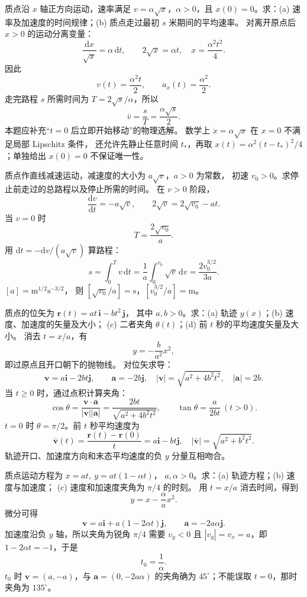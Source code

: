 质点沿 $x$ 轴正方向运动，速率满足 $v=\alpha\sqrt{x}$，$\alpha>0$，且
$x(0)=0$。求：(a) 速率及加速度的时间规律；(b) 质点走过最初 $s$ 米期间的平均速率。
\exsolution
对离开原点后 $x>0$ 的运动分离变量：
\[
 \frac{\mathrm dx}{\sqrt{x}}=\alpha\,\mathrm dt,\qquad
 2\sqrt{x}=\alpha t,
\quad x=\frac{\alpha^2t^2}{4}.
\]
因此
\[
 \boxed{v(t)=\frac{\alpha^2t}{2},\qquad a_x(t)=\frac{\alpha^2}{2}.}
\]
走完路程 $s$ 所需时间为 $T=2\sqrt{s}/\alpha$，所以
\[
 \boxed{\bar v=\frac{s}{T}=\frac{\alpha\sqrt{s}}2.}
\]
\excheck 本题应补充“$t=0$ 后立即开始移动”的物理选解。
数学上 $\dot x=\alpha\sqrt{x}$ 在 $x=0$ 不满足局部 Lipschitz 条件，
还允许先静止任意时间 $t_*$，再取
$x(t)=\alpha^2(t-t_*)^2/4$；单独给出 $x(0)=0$ 不保证唯一性。

质点作直线减速运动，减速度的大小为 $a\sqrt v$，$a>0$ 为常数，
初速 $v_0>0$。求停止前走过的总路程以及停止所需的时间。
\exsolution
在 $v>0$ 阶段，
\[
 \frac{\mathrm dv}{\mathrm dt}=-a\sqrt v,\qquad
 2\sqrt v=2\sqrt{v_0}-at.
\]
当 $v=0$ 时
\[
 \boxed{T=\frac{2\sqrt{v_0}}a.}
\]
用 $\mathrm dt=-\mathrm dv/(a\sqrt v)$ 算路程：
\[
 s=\int_0^T v\,\mathrm dt
   =\frac1a\int_0^{v_0}\sqrt v\,\mathrm dv
   =\boxed{\frac{2v_0^{3/2}}{3a}}.
\]
\excheck $[a]=\mathrm{m}^{1/2}\mathrm{s}^{-3/2}$，
则 $[\sqrt{v_0}/a]=\mathrm s$，$[v_0^{3/2}/a]=\mathrm m$。

质点的位矢为 $\bm r(t)=at\,\bm i-bt^2\,\bm j$，
其中 $a,b>0$。求：(a) 轨迹 $y(x)$；(b) 速度、加速度的矢量及大小；
(c) 二者夹角 $\theta(t)$；(d) 前 $t$ 秒的平均速度矢量及大小。
\exsolution
消去 $t=x/a$，有
\[
 \boxed{y=-\frac b{a^2}x^2},
\]
即过原点且开口朝下的抛物线。
对位矢求导：
\[
 \boxed{\bm v=a\bm i-2bt\bm j,\qquad
 \bm a=-2b\bm j},\quad
 |\bm v|=\sqrt{a^2+4b^2t^2},\quad|\bm a|=2b.
\]
当 $t\ge0$ 时，通过点积计算夹角：
\[
 \cos\theta=\frac{\bm v\cdot\bm a}{|\bm v||\bm a|}
 =\frac{2bt}{\sqrt{a^2+4b^2t^2}},\qquad
 \boxed{\tan\theta=\frac a{2bt}\ (t>0)}.
\]
$t=0$ 时 $\theta=\pi/2$。前 $t$ 秒平均速度为
\[
 \boxed{\bar{\bm v}(t)=\frac{\bm r(t)-\bm r(0)}t
 =a\bm i-bt\bm j,\quad
 |\bar{\bm v}|=\sqrt{a^2+b^2t^2}.}
\]
\excheck 轨迹开口、加速度方向和末态平均速度的负 $y$ 分量互相吻合。

质点运动方程为 $x=at,\ y=at(1-\alpha t)$，
$a,\alpha>0$。求：(a) 轨迹方程；(b) 速度与加速度；
(c) 速度和加速度夹角为 $\pi/4$ 的时刻。
\exsolution
用 $t=x/a$ 消去时间，得到
\[
 \boxed{y=x-\frac{\alpha}{a}x^2}.
\]
微分可得
\[
 \boxed{\bm v=a\bm i+a(1-2\alpha t)\bm j,\qquad
 \bm a=-2a\alpha\bm j}.
\]
加速度沿负 $y$ 轴，所以夹角为锐角 $\pi/4$ 需要
$v_y<0$ 且 $|v_y|=v_x=a$，即 $1-2\alpha t=-1$，于是
\[
 \boxed{t_0=\frac1\alpha}.
\]
\excheck $t_0$ 时 $\bm v=(a,-a)$，与 $\bm a=(0,-2a\alpha)$
的夹角确为 $45^\circ$；不能误取 $t=0$，那时夹角为 $135^\circ$。

